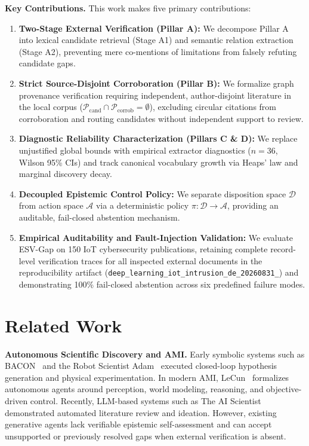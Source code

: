 \documentclass[runningheads]{llncs}
\newcommand{\method}{ESV-Gap}
\newcommand{\runid}{\texttt{deep\_learning\_\allowbreak iot\_intrusion\_\allowbreak de\_20260831\_\allowbreak 114802}}
\begin{document}
\noindent\textbf{Key Contributions.} This work makes five primary contributions:
\begin{enumerate}\setlength{\itemsep}{0pt}\setlength{\topsep}{2pt}\setlength{\parsep}{0pt}\setlength{\partopsep}{0pt}
  \item \textbf{Two-Stage External Verification (Pillar A):} We decompose Pillar A into lexical candidate retrieval (Stage A1) and semantic relation extraction (Stage A2), preventing mere co-mentions of limitations from falsely refuting candidate gaps.
  \item \textbf{Strict Source-Disjoint Corroboration (Pillar B):} We formalize graph provenance verification requiring independent, author-disjoint literature in the local corpus ($\mathcal{P}_{\text{cand}} \cap \mathcal{P}_{\text{corrob}} = \emptyset$), excluding circular citations from corroboration and routing candidates without independent support to review.
  \item \textbf{Diagnostic Reliability Characterization (Pillars C \& D):} We replace unjustified global bounds with empirical extractor diagnostics ($n=36$, Wilson 95\% CIs) and track canonical vocabulary growth via Heaps' law and marginal discovery decay.
  \item \textbf{Decoupled Epistemic Control Policy:} We separate disposition space $\mathcal{D}$ from action space $\mathcal{A}$ via a deterministic policy $\pi: \mathcal{D} \rightarrow \mathcal{A}$, providing an auditable, fail-closed abstention mechanism.
  \item \textbf{Empirical Auditability and Fault-Injection Validation:} We evaluate \method{} on 150 IoT cybersecurity publications, retaining complete record-level verification traces for all inspected external documents in the reproducibility artifact (\runid{}) and demonstrating 100\% fail-closed abstention across six predefined failure modes.
\end{enumerate}

\section{Related Work}
\label{sec:related}

\noindent\textbf{Autonomous Scientific Discovery and AMI.} Early symbolic systems such as BACON~\cite{langley1987} and the Robot Scientist Adam~\cite{king2009automation} executed closed-loop hypothesis generation and physical experimentation. In modern AMI, LeCun~\cite{lecun2022path} formalizes autonomous agents around perception, world modeling, reasoning, and objective-driven control. Recently, LLM-based systems such as The AI Scientist~\cite{aiscientist2024} demonstrated automated literature review and ideation. However, existing generative agents lack verifiable epistemic self-assessment and can accept unsupported or previously resolved gaps when external verification is absent.
\end{document}
